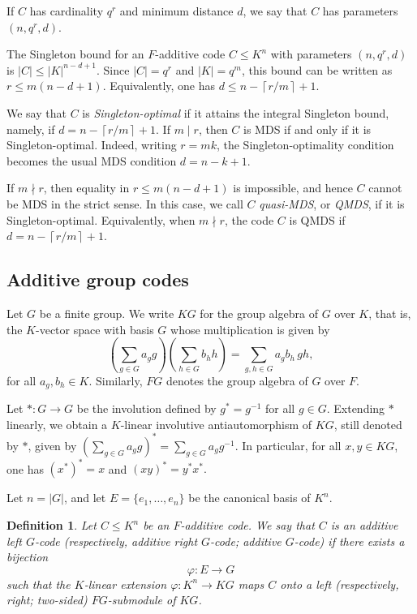 \documentclass[11pt]{article}
\newtheorem{definition}[theorem]{Definition}
\begin{document}
If $C$ has cardinality $q^r$ and minimum distance $d$, we say that $C$ has parameters $(n,q^r,d)$.


 The Singleton bound for an $F$-additive code $C\leq K^n$ with parameters
$(n,q^r,d)$ is $|C|\leq |K|^{n-d+1}$. Since $|C|=q^r$ and $|K|=q^m$, this
bound can be written as $r\leq m(n-d+1)$. Equivalently, one has
$d\leq n-\left\lceil r/m\right\rceil+1$.

We say that $C$ is \emph{Singleton-optimal} if it attains the integral
Singleton bound, namely, if $d=n-\left\lceil r/m\right\rceil+1$. If
$m\mid r$, then $C$ is MDS if and only if it is Singleton-optimal. Indeed,
writing $r=mk$, the Singleton-optimality condition becomes the usual MDS
condition $d=n-k+1$.

If $m\nmid r$, then equality in $r\leq m(n-d+1)$ is impossible, and hence
$C$ cannot be MDS in the strict sense. In this case, we call $C$
\emph{quasi-MDS}, or \emph{QMDS}, if it is Singleton-optimal. Equivalently,
when $m\nmid r$, the code $C$ is QMDS if
$d=n-\left\lceil r/m\right\rceil+1$.


\subsection{Additive group codes}
Let $G$ be a finite group. We write $KG$ for the group algebra of $G$ over $K$, that is, the $K$-vector space with basis $G$ whose multiplication is given by
$$
\left(\sum_{g\in G} a_g g\right)\left(\sum_{h\in G} b_h h\right)=\sum_{g,h\in G} a_g b_h\,gh,
$$
for all $a_g,b_h\in K$. Similarly, $FG$ denotes the group algebra of $G$ over $F$.

Let $\ast:G\longrightarrow G$ be the involution defined by $g^\ast=g^{-1}$ for all $g\in G$. Extending $\ast$ linearly, we obtain a $K$-linear involutive antiautomorphism of $KG$, still denoted by $\ast$, given by
$
\left(\sum_{g\in G} a_g g\right)^\ast=\sum_{g\in G} a_g g^{-1}.
$
In particular, for all $x,y\in KG$, one has
$
(x^\ast)^\ast=x
$
and
$
(xy)^\ast=y^\ast x^\ast.
$

Let $n=|G|$, and let $E=\{e_1,\dots,e_n\}$ be the canonical basis of $K^n$.

\begin{definition}
Let $C\leq K^n$ be an $F$-additive code. We say that $C$ is an \emph{additive left $G$-code} (respectively, \emph{additive right $G$-code}; \emph{additive $G$-code}) if there exists a bijection
$$
\varphi:E\longrightarrow G
$$
such that the $K$-linear extension $\varphi:K^n\longrightarrow KG$ maps $C$ onto a left (respectively, right; two-sided) $FG$-submodule of $KG$.
\end{definition}
\end{document}
